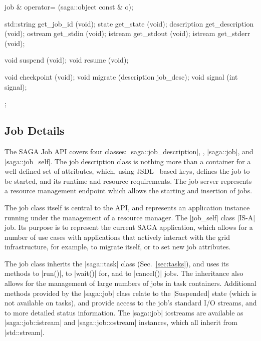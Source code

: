 \begin{mycode}[label=Prototypes: saga::job]
{{{          job & operator= (saga::object const & o);

          std::string get_job_id      (void);
          state       get_state       (void);
          description get_description (void);
          ostream     get_stdin       (void);
          istream     get_stdout      (void);
          istream     get_stderr      (void);

          void        suspend         (void);
          void        resume          (void);

          void        checkpoint      (void);
          void        migrate         (description job_desc);
          void        signal          (int         signal);
      };
    }
  }
   \end{mycode}


 \subsection{Job Details}

  The SAGA Job API covers four classes: |saga::job_description|,
   , |saga::job|, and |saga::job_self|.
  The job description class is nothing more than a container for a
  well-defined set of attributes, which, using
  JSDL~\cite{jsdl-spec,jsdl-spmd} based keys, defines the job to be
  started, and its runtime and resource requirements.  The job server
  represents a resource management endpoint which allows the starting
  and insertion of jobs. 
  
  The job class itself is central to the API, and represents an
  application instance running under the management of a
  resource manager.  The |job_self| class |IS-A| job.  Its
  purpose is to represent the current SAGA application, which
  allows for a number of use cases with applications that
  actively interact with the grid infrastructure, for example, to
  migrate itself, or to set new job attributes.
  
  The job class inherits the |saga::task| class (Sec.~\ref{sec:tasks}),
  and uses its methods to |run()|, to |wait()| for, and to
  |cancel()| jobs.  The inheritance also allows for the
  management of large numbers of jobs in task containers.
  Additional methods provided by the |saga::job| class relate to
  the |Suspended| state (which is not available on tasks), and
  provide access to the job's standard I/O streams, and to more
  detailed status information.  The |saga::job| iostreams are
  available as |saga::job::istream| and |saga::job::ostream|
  instances, which all inherit from |std::stream|.


